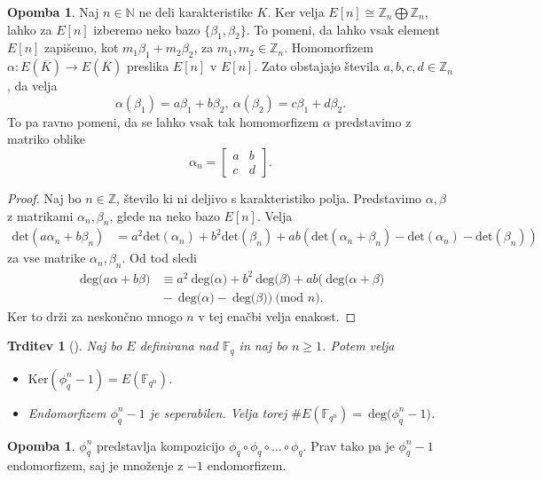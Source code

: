 \documentclass[12pt,a4paper,twoside]{article}
\theoremstyle{definition} %
\newtheorem{opomba}[definicija]{Opomba}
\theoremstyle{plain} %
\newtheorem{trditev}[definicija]{Trditev}
\numberwithin{equation}{section}  %
\newcommand{\N}{\mathbb N}
\newcommand{\Z}{\mathbb Z}
\newcommand{\F}{\mathbb F}
\newcommand{\E}[1]{E({#1})}
\newcommand{\MOD}[1]{\ \text{(mod }{#1}\text{)}}
\newcommand{\DEG}[1]{\ \text{deg(}{#1}\text{)}}
\begin{document}
\begin{opomba}
Naj $n \in \N$ ne deli karakteristike $K$. Ker velja $E[n] \cong \Z_n \bigoplus \Z_n$, lahko za $E[n]$ izberemo neko bazo $\{ \beta_1, \beta_2\}$. To pomeni, da lahko vsak element $E[n]$ zapišemo, kot $m_1\beta_1 + m_2\beta_2$, za $m_1, m_2 \in \Z_n$. Homomorfizem $\alpha: \E{\overline{K}} \rightarrow \E{\overline{K}}$ preslika $E[n]$ v $E[n]$. Zato obstajajo števila $a,b,c,d \in \Z_n$, da velja
$$\alpha(\beta_1) = a\beta_1+b\beta_2, \ \alpha(\beta_2) = c\beta_1+d\beta_2.$$
To pa ravno pomeni, da se lahko vsak tak homomorfizem $\alpha$ predstavimo z matriko oblike
$$\alpha_n = \begin{bmatrix}
a & b \\
c & d
\end{bmatrix}.$$
\end{opomba}

\begin{proof}
Naj bo $n \in \Z$, število ki ni deljivo s karakteristiko polja. Predstavimo $\alpha,\beta$ z matrikami $\alpha_n,\beta_n$, glede na neko bazo $E[n]$.
Velja
\begin{align}
\text{det}(a\alpha_n+b\beta_n) &{}=  a^2\text{det}(\alpha_n)+b^2\text{det}(\beta_n) + ab(\text{det}(\alpha_n+\beta_n)-\text{det}(\alpha_n)-\text{det}(\beta_n)) \nonumber
\end{align}
za vse matrike $\alpha_n,\beta_n$.
Od tod sledi
\begin{align}
\DEG{a\alpha+b\beta} &{}\equiv a^2\DEG{\alpha}+b^2\DEG{\beta} + ab(\DEG{\alpha+\beta} \nonumber \\
&{}-\DEG{\alpha}-\DEG{\beta}) \MOD{n}. \nonumber
\end{align}
Ker to drži za neskončno mnogo $n$ v tej enačbi velja enakost.


\end{proof}

\begin{trditev}[]
\label{trd:4.7}
Naj bo $E$ definirana nad $\F_q$ in naj bo $n \geq 1$. Potem velja
\begin{itemize}
\item $\text{Ker}(\phi^n_q-1) = \E{\F_{q^n}}$.
\item Endomorfizem $\phi^n_q-1$ je seperabilen. Velja torej $\#\E{\F_{q^n}} = \DEG{\phi^n_q-1}$.
\end{itemize}
\end{trditev}

\begin{opomba}
$\phi^n_q$ predstavlja kompozicijo $\phi_q \circ \phi_q \circ \ldots \circ \phi_q$. Prav tako pa je $\phi^n_q-1$ endomorfizem, saj je množenje z $-1$ endomorfizem.
\end{opomba}
\end{document}
